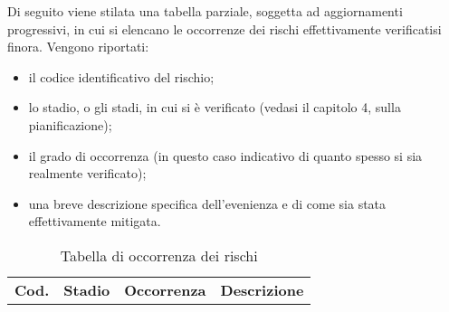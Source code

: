 Di seguito viene stilata una tabella parziale, soggetta ad aggiornamenti progressivi, in cui si elencano le occorrenze dei rischi effettivamente verificatisi finora. Vengono riportati:
\begin{itemize}
    \item il codice identificativo del rischio;
    \item lo stadio, o gli stadi, in cui si è verificato (vedasi il capitolo 4, sulla pianificazione);
    \item il grado di occorrenza (in questo caso indicativo di quanto spesso si sia realmente verificato);
    \item una breve descrizione specifica dell'evenienza e di come sia stata effettivamente mitigata.
\end{itemize}
{
        \renewcommand{\arraystretch}{1.5}
        \centering
        \begin{longtable}{|p{0.8cm}|p{1.2cm}|p{2cm}|p{8.8cm}|}
        \caption{Tabella di occorrenza dei rischi}\\
        \rowcolor{\primaryColor}
        \textcolor{\secondaryColor}{\textbf{Cod.}} & 
        \textcolor{\secondaryColor}{\textbf{Stadio}} & 
        \textcolor{\secondaryColor}{\textbf{Occorrenza}} & 
        \textcolor{\secondaryColor}{\textbf{Descrizione}}\\
       

\end{longtable}}
